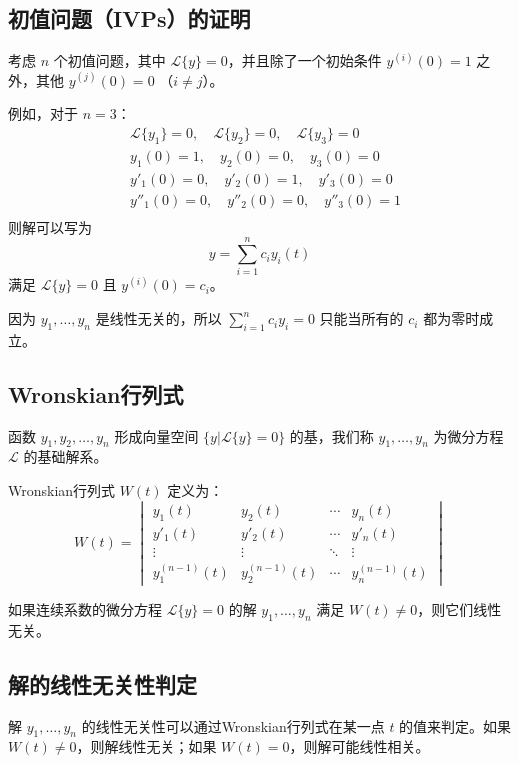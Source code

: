 \documentclass{ctexart}
\begin{document}
\subsection*{初值问题（IVPs）的证明}
考虑 \( n \) 个初值问题，其中 \( \mathcal{L}\{y\} = 0 \)，并且除了一个初始条件 \( y^{(i)}(0) = 1 \) 之外，其他 \( y^{(j)}(0) = 0 \) （\( i \neq j \)）。

例如，对于 \( n = 3 \)：
\[
\begin{aligned}
&\mathcal{L}\{y_1\} = 0, \quad \mathcal{L}\{y_2\} = 0, \quad \mathcal{L}\{y_3\} = 0 \\
&y_1(0) = 1, \quad y_2(0) = 0, \quad y_3(0) = 0 \\
&y'_1(0) = 0, \quad y'_2(0) = 1, \quad y'_3(0) = 0 \\
&y''_1(0) = 0, \quad y''_2(0) = 0, \quad y''_3(0) = 1 \\
\end{aligned}
\]
则解可以写为
\[
y = \sum_{i=1}^{n} c_i y_i(t)
\]
满足 \( \mathcal{L}\{y\} = 0 \) 且 \( y^{(i)}(0) = c_i \)。

因为 \( y_1, \ldots, y_n \) 是线性无关的，所以 \( \sum_{i=1}^{n} c_i y_i = 0 \) 只能当所有的 \( c_i \) 都为零时成立。






\subsection*{Wronskian行列式}
函数 \( y_1, y_2, \ldots, y_n \) 形成向量空间 \( \{ y | \mathcal{L}\{y\} = 0 \} \) 的基，我们称 \( y_1, \ldots, y_n \) 为微分方程 \( \mathcal{L} \) 的基础解系。

Wronskian行列式 \( W(t) \) 定义为：
\[
W(t) = \begin{vmatrix}
y_1(t) & y_2(t) & \cdots & y_n(t) \\
y'_1(t) & y'_2(t) & \cdots & y'_n(t) \\
\vdots & \vdots & \ddots & \vdots \\
y^{(n-1)}_1(t) & y^{(n-1)}_2(t) & \cdots & y^{(n-1)}_n(t)
\end{vmatrix}
\]

如果连续系数的微分方程 \( \mathcal{L}\{y\} = 0 \) 的解 \( y_1, \ldots, y_n \) 满足 \( W(t) \neq 0 \)，则它们线性无关。

\subsection*{解的线性无关性判定}
解 \( y_1, \ldots, y_n \) 的线性无关性可以通过Wronskian行列式在某一点 \( t \) 的值来判定。如果 \( W(t) \neq 0 \)，则解线性无关；如果 \( W(t) = 0 \)，则解可能线性相关。
\end{document}
